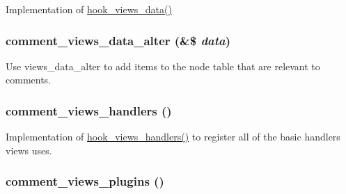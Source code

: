 Implementation of \hyperlink{group__views__hooks_g227057901681e4a33e33c199c7a8c989}{hook\_\-views\_\-data()} \hypertarget{group__views__comment__module_gf68bf474455d07d3fc30c9f61b830f30}{
\subsubsection[{comment\_\-views\_\-data\_\-alter}]{\setlength{\rightskip}{0pt plus 5cm}comment\_\-views\_\-data\_\-alter (\&\$ {\em data})}}
\label{group__views__comment__module_gf68bf474455d07d3fc30c9f61b830f30}


Use views\_\-data\_\-alter to add items to the node table that are relevant to comments. \hypertarget{group__views__comment__module_gf77bd2e2e209c8442ed09037243c879b}{
\subsubsection[{comment\_\-views\_\-handlers}]{\setlength{\rightskip}{0pt plus 5cm}comment\_\-views\_\-handlers ()}}
\label{group__views__comment__module_gf77bd2e2e209c8442ed09037243c879b}


Implementation of \hyperlink{group__views__hooks_gbf506f44bd8d8a86876f27396f5341ed}{hook\_\-views\_\-handlers()} to register all of the basic handlers views uses. \hypertarget{group__views__comment__module_g20b0377d6793f1f1e1b70bcae9dd067b}{
\subsubsection[{comment\_\-views\_\-plugins}]{\setlength{\rightskip}{0pt plus 5cm}comment\_\-views\_\-plugins ()}}
\label{group__views__comment__module_g20b0377d6793f1f1e1b70bcae9dd067b}


